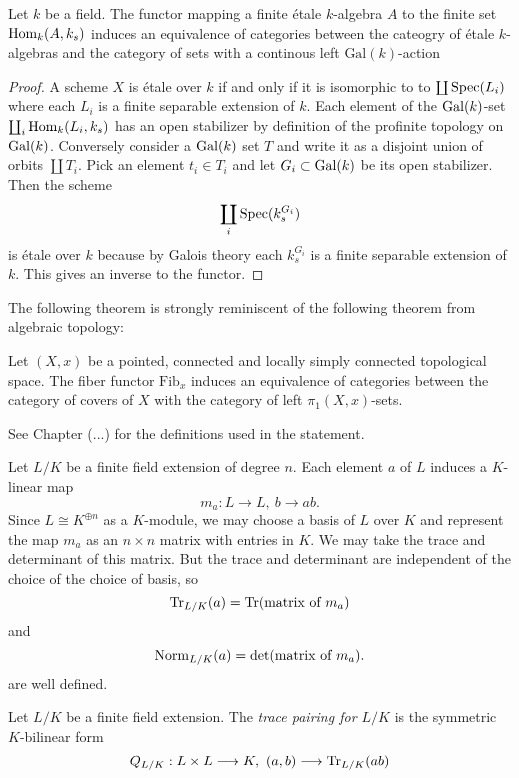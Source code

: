 \begin{theorem}
  Let $k$ be a field. The functor mapping a finite \'etale $k$-algebra $A$ to the finite set $\operatorname{Hom}_k(A, k_s)$ induces an equivalence of categories between the cateogry of \'etale $k$-algebras and the category of sets with a continous left $\text{Gal}(k)$-action
\end{theorem}

\begin{proof}
  A scheme $X$ is \'etale over $k$ if and only if it is isomorphic to to $\coprod \operatorname{Spec}(L_i)$ where each $L_i$ is a finite separable extension of $k$. Each element of the $\operatorname{Gal}(k)$-set $\coprod_i \operatorname{Hom}_k(L_i, k_s)$ has an open stabilizer by definition of the profinite topology on $\operatorname{Gal}(k)$. Conversely consider a $\operatorname{Gal}(k)$ set $T$ and write it as a disjoint union of orbits $\coprod T_i$. Pick an element $t_i \in T_i$ and let $G_i \subset \operatorname{Gal}(k)$ be its open stabilizer. Then the scheme 
  \[
    \coprod_i \operatorname{Spec}(k_s^{G_i})
  \]
  is \'etale over $k$ because by Galois theory each $k_s^{G_i}$ is a finite separable extension of $k$. This gives an inverse to the functor.
\end{proof}

The following theorem is strongly reminiscent of the following theorem from algebraic topology:

\begin{theorem}
  Let $(X,x)$ be a pointed, connected and locally simply connected topological space. The fiber functor $\text{Fib}_x$ induces an equivalence of categories between the category of covers of $X$ with the category of left $\pi_1(X,x)$-sets.
\end{theorem}

See Chapter (...) for the definitions used in the statement.

Let $L/K$ be a finite field extension of degree $n$. Each element $a$ of $L$ induces a $K$-linear map 
\[
  m_a: L \to L,\ b \to ab.
\]
Since $L \cong K^{\oplus n}$ as a $K$-module, we may choose a basis of $L$ over $K$ and represent the map $m_a$ as an $n \times n$ matrix with entries in $K$. We may take the trace and determinant of this matrix. But the trace and determinant are independent of the choice of the choice of basis, so
\[ 
  \operatorname{Tr}_{L/K}(a) = \operatorname{Tr}(\text{matrix of }m_a)
\]
and
\[ 
  \operatorname{Norm}_{L/K}(a) = \text{det}(\text{matrix of }m_a).
\]
are well defined.

\begin{definition}
  Let $L/K$ be a finite field extension. The \textit{trace pairing for $L/K$} is the symmetric $K$-bilinear form
  \[
    Q_{L/K} : L \times L \longrightarrow K,\ (a,b) \longrightarrow \operatorname{Tr}_{L/K}(ab)
  \]
\end{definition}

